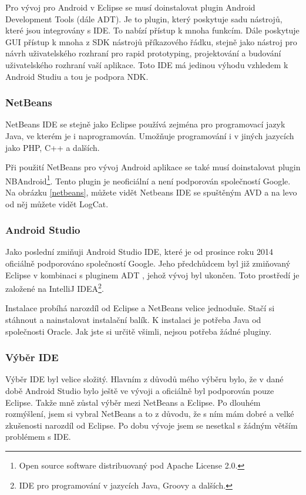 \documentclass[12pt]{article}
\begin{document}
Pro vývoj pro Android v Eclipse se musí doinstalovat plugin Android Development Tools (dále ADT). Je to plugin, který poskytuje sadu nástrojů, které jsou integrovány s IDE. To nabízí přístup k mnoha funkcím. Dále poskytuje GUI přístup k mnoha z SDK nástrojů příkazového řádku, stejně jako nástroj pro návrh uživatelského rozhraní pro rapid prototyping, projektování a budování uživatelského rozhraní vaší aplikace. Toto IDE má jedinou výhodu vzhledem k Android Studiu a tou je podpora NDK. \cite{eclipse}
\subsubsection{NetBeans}
NetBeans IDE se stejně jako Eclipse používá zejména pro programovací jazyk Java, ve kterém je i naprogramován. Umožňuje programování i v jiných jazycích jako PHP, C++ a dalších.

Při použití NetBeans pro vývoj Android aplikace se také musí doinstalovat plugin NBAndroid\footnote[6]{Open source software distribuovaný pod Apache License 2.0.}. Tento plugin je neoficiální a není podporován společností Google. Na obrázku \ref{netbeans}, můžete vidět Netbeans IDE se spuštěným AVD a na levo od něj můžete vidět LogCat.
\subsubsection{Android Studio}
Jako poslední zmiňuji Android Studio IDE, které je od prosince roku 2014 oficiálně podporováno společností Google. Jeho předchůdcem byl již zmiňovaný Eclipse v kombinaci s pluginem ADT	, jehož vývoj byl ukončen. Toto prostředí je založené na IntelliJ IDEA\footnote[7]{IDE pro programování v jazycích Java, Groovy a dalších.}.

Instalace probíhá narozdíl od Eclipse a NetBeans velice jednoduše. Stačí si stáhnout a nainstalovat instalační balík. K instalaci je potřeba Java od společnosti Oracle. Jak jste si určitě všimli, nejsou potřeba žádné pluginy. \cite{studio}

\subsubsection{Výběr IDE}
Výběr IDE byl velice složitý. Hlavním z důvodů mého výběru bylo, že v dané době Android Studio bylo ještě ve vývoji a oficiálně byl podporován pouze Eclipse. Takže mně zůstal výběr mezi NetBeans a Eclipse. Po dlouhém rozmýšlení, jsem si vybral NetBeans a to z důvodu, že s ním mám dobré a velké zkušenosti narozdíl od Eclipse. Po dobu vývoje jsem se nesetkal s žádným větším problémem s IDE.
\end{document}
